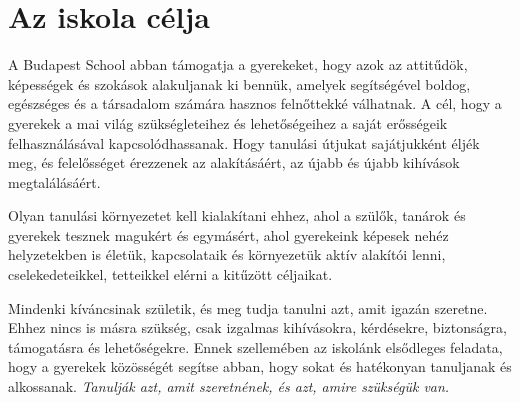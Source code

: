 \section{Az iskola célja}
\label{sec:iskola_celja}

A Budapest School abban támogatja a gyerekeket, hogy azok az
attitűdök, képességek és szokások alakuljanak ki bennük, amelyek segítségével
boldog, egészséges és a társadalom számára hasznos felnőttekké válhatnak. A
cél, hogy a gyerekek a mai világ szükségleteihez és lehetőségeihez a saját
erősségeik felhasználásával kapcsolódhassanak.	Hogy tanulási útjukat
sajátjukként éljék meg, és felelősséget érezzenek az alakításáért, az újabb és
újabb kihívások megtalálásáért.

Olyan tanulási környezetet kell kialakítani ehhez, ahol a szülők, tanárok és
gyerekek tesznek magukért és egymásért, ahol gyerekeink képesek nehéz
helyzetekben is életük, kapcsolataik és környezetük aktív alakítói lenni,
cselekedeteikkel, tetteikkel elérni a kitűzött céljaikat.

Mindenki kíváncsinak születik, és meg tudja tanulni azt, amit
igazán szeretne. Ehhez nincs is másra szükség, csak izgalmas kihívásokra, kérdésekre,
biztonságra, támogatásra és lehetőségekre. Ennek szellemében az iskolánk elsődleges feladata, hogy a gyerekek közösségét
segítse abban, hogy sokat és hatékonyan tanuljanak és alkossanak.
\emph{Tanulják azt, amit szeretnének, és azt, amire szükségük van.}